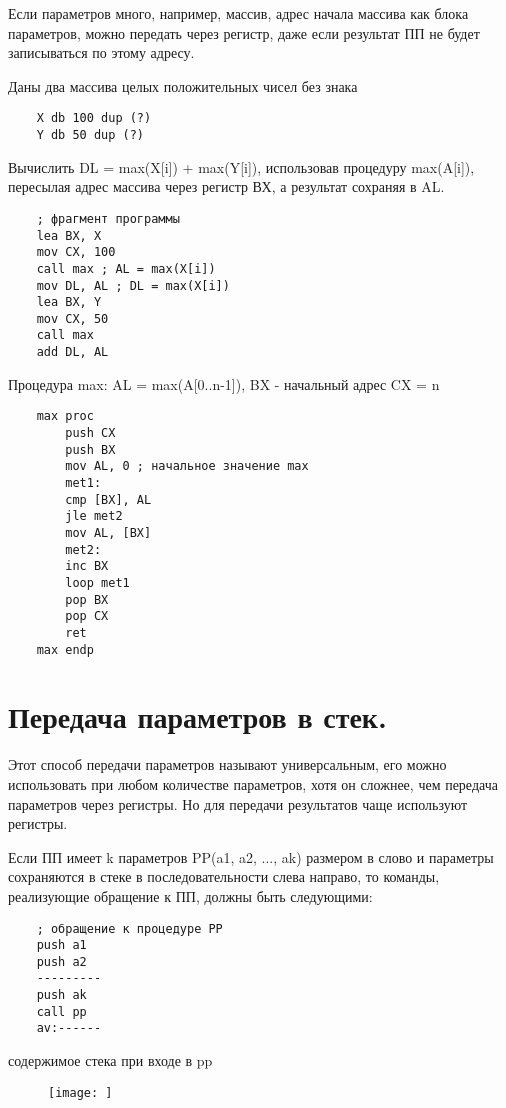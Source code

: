 Если параметров много, например, массив, адрес начала массива как блока параметров, можно передать через регистр, даже если результат ПП не будет записываться по этому адресу.

Даны два массива целых положительных чисел без знака
\begin{verbatim}
    X db 100 dup (?)
    Y db 50 dup (?)
\end{verbatim}

Вычислить DL = max(X[i]) + max(Y[i]), использовав процедуру max(A[i]), пересылая адрес массива через регистр ВХ, а результат сохраняя в AL.
\begin{verbatim}
    ; фрагмент программы
    lea BX, X
    mov CX, 100
    call max ; AL = max(X[i])
    mov DL, AL ; DL = max(X[i])
    lea BX, Y
    mov CX, 50
    call max
    add DL, AL
\end{verbatim}

Процедура max: AL = max(A[0..n-1]), BX - начальный адрес CX = n

\begin{verbatim}
    max proc
        push CX
        push BX
        mov AL, 0 ; начальное значение max
        met1:
        cmp [BX], AL
        jle met2
        mov AL, [BX]
        met2:
        inc BX
        loop met1
        pop BX
        pop CX
        ret
    max endp
\end{verbatim}

\section{Передача параметров в стек.}

Этот способ передачи параметров называют универсальным, его можно использовать при любом количестве параметров, хотя он сложнее, чем передача параметров через регистры.
Но для передачи результатов чаще используют регистры.

Если ПП имеет k параметров PP(a1, a2, ..., ak) размером в слово и параметры сохраняются в стеке в последовательности слева направо, то команды, реализующие обращение к ПП, должны быть следующими:

\begin{verbatim}
    ; обращение к процедуре PP
    push a1
    push a2
    ---------
    push ak
    call pp
    av:------
\end{verbatim}

содержимое стека при входе в pp
\begin{figure}
    \texttt{[image: ]}
\end{figure}

